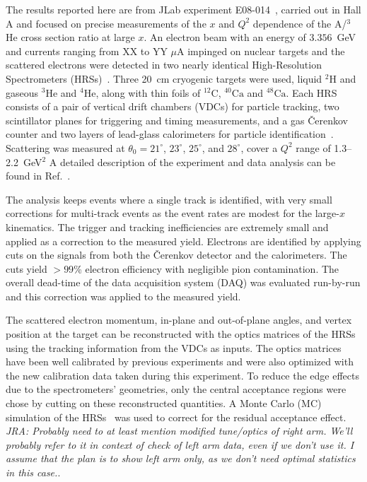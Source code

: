 The results reported here are from JLab experiment E08-014~\cite{e08014_pr}, carried out in Hall A and focused on precise measurements of the
$x$ and $Q^2$ dependence of the A/$^3$He cross section ratio at large $x$. An electron beam with an energy of $3.356$~GeV and currents ranging
from XX to YY $\mu$A impinged on nuclear targets and the scattered electrons were detected in two nearly identical High-Resolution
Spectrometers (HRSs)~\cite{halla_nim}. Three 20~cm cryogenic targets were used, liquid $^2$H and gaseous $^3$He and $^4$He, along with thin foils
of $\mathrm{^{12}C}$, $\mathrm{^{40}Ca}$ and $\mathrm{^{48}Ca}$. Each HRS consists of a pair of vertical drift chambers (VDCs) for particle
tracking, two scintillator planes for triggering and timing measurements, and a gas \v{C}erenkov counter and two layers of lead-glass calorimeters
for particle identification~\cite{halla_nim}. Scattering was measured at $\theta_{0}=21^\circ$, $23^\circ$, $25^\circ$, and $28^\circ$,
cover a $Q^2$ range of 1.3--2.2~GeV$^2$ A detailed description of the experiment and data analysis can be found in Ref.~\cite{zye_thesis}.



The analysis keeps events where a single track is identified, with very small corrections for multi-track events as the event rates are modest
for the large-$x$ kinematics. The trigger and tracking inefficiencies are extremely small and applied as a correction to the measured yield.
Electrons are identified by applying cuts on the signals from both the \v{C}erenkov detector and the calorimeters. The cuts yield $>99$\% electron
efficiency with negligible pion contamination. The overall dead-time of the data acquisition system (DAQ) was evaluated run-by-run and this
correction was applied to the measured yield.


The scattered electron momentum, in-plane and out-of-plane angles, and vertex position at the target can be reconstructed with the optics matrices
of the HRSs using the tracking information from the VDCs as inputs. The optics matrices have been well calibrated by previous experiments and
were also optimized with the new calibration data taken during this experiment. To reduce the edge effects due to the spectrometers' geometries,
only the central acceptance regions were chose by cutting on these reconstructed quantities. A Monte Carlo (MC) simulation of the
HRSs~\cite{zye_thesis} was used to correct for the residual acceptance effect.
%
\textit{JRA: Probably need to at least mention modified tune/optics of right arm.  We'll probably refer to it in context of check of left arm
data, even if we don't use it. I assume that the plan is to show left arm only, as we don't need optimal statistics in this case.}.

